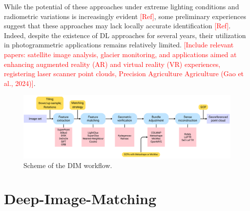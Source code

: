 While the potential of these approaches under extreme lighting conditions and radiometric variations is increasingly evident \textcolor{red}{[Ref]}, some preliminary experiences suggest that these approaches may lack locally accurate identification \textcolor{red}{[Ref]}. 
Indeed, despite the existence of DL approaches for several years, their utilization in photogrammetric applications remains relatively limited. 
\textcolor{red}{[Include relevant papers: satellite image analysis, glacier monitoring, and applications aimed at enhancing augmented reality (AR) and virtual reality (VR) experiences, registering laser scanner point clouds, Precision Agriculture Agriculture (Gao et al., 2024)]}.

\begin{figure}[ht]
    \centering
    \includegraphics[width=1\textwidth]{dim_workflow_simple}
    \caption{Scheme of the DIM workflow.}
    \label{fig:5:dim_workflow}
\end{figure}

\section{Deep-Image-Matching}

